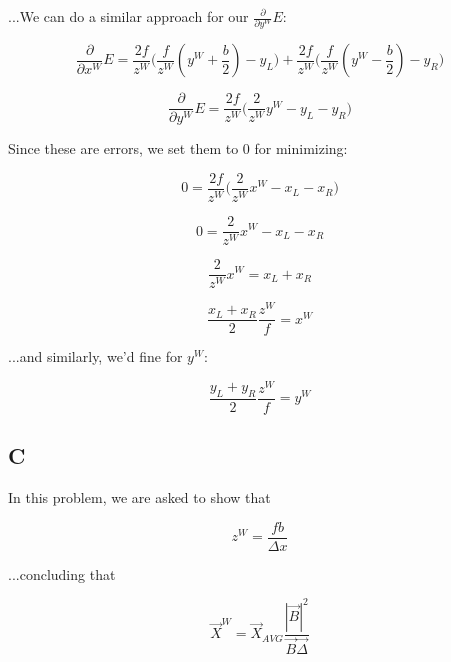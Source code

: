 \documentclass{article}
\begin{document}
\noindent...We can do a similar approach for our $\frac{\partial}{\partial y^W} E$:

\begin{equation}
    \frac{\partial}{\partial x^W} E = 
    \frac{2f}{z^W} \bigl(\frac{f}{z^W} (y^W+\frac{b}{2})-y_L\bigr) + 
    \frac{2f}{z^W} \bigl(\frac{f}{z^W} (y^W-\frac{b}{2})-y_R\bigr)
\end{equation}

\begin{equation}
    \frac{\partial}{\partial y^W} E = \frac{2f}{z^W}\bigl( 
        \frac{2}{z^W}y^W-y_L-y_R
    \bigr)
\end{equation}

\noindent Since these are errors, we set them to 0 for minimizing:

\begin{equation}
    0 = \frac{2f}{z^W}\bigl( 
        \frac{2}{z^W}x^W-x_L-x_R
    \bigr)
\end{equation}

\begin{equation}
    0 = \frac{2}{z^W}x^W-x_L-x_R
\end{equation}

\begin{equation}
    \frac{2}{z^W}x^W = x_L+x_R
\end{equation}

\begin{equation}
    \frac{x_L+x_R}{2}\frac{z^W}{f}=x^W
\end{equation}

\noindent ...and similarly, we'd fine for $y^W$:

\begin{equation}
    \frac{y_L+y_R}{2}\frac{z^W}{f}=y^W
\end{equation}

\subsection*{C}

In this problem, we are asked to show that

\begin{equation}
    z^W = \frac{fb}{\Delta x}
\end{equation}

\noindent ...concluding that

\begin{equation}
    \vec{X}^W=\vec{X}_{AVG}\frac{|\vec{B}|^2}{\vec{B}\vec{\Delta}}
\end{equation}
\end{document}
